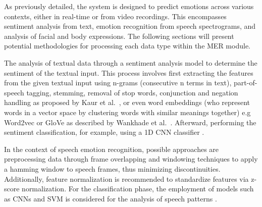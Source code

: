 \documentclass[runningheads]{llncs}
\begin{document}
As previously detailed, the system is designed to predict emotions across various contexts, either in real-time or from video recordings. This encompasses sentiment analysis from text, emotion recognition from speech spectrograms, and analysis of facial and body expressions. The following sections will present potential methodologies for processing each data type within the MER module.

The analysis of textual data through a sentiment analysis model to determine the sentiment of the textual input. This process involves first extracting the features from the given textual input using n-grams (consecutive n terms in text), part-of-speech tagging, stemming, removal of stop words, conjunction and negation handling as proposed by Kaur et al.~\cite{kaur_survey_2017}, or even word embeddings (who represent words in a vector space by clustering words with similar meanings together) e.g Word2vec or GloVe as described by Wankhade et al.~\cite{wankhade_survey_2022}. Afterward, performing the sentiment classification, for example, using a 1D CNN classifier \cite{hung_beyond_2023}.

In the context of speech emotion recognition, possible approaches are preprocessing data through frame overlapping and windowing techniques to apply a hamming window to speech frames, thus minimizing discontinuities. Additionally, feature normalization is recommended to standardize features via z-score normalization. For the classification phase, the employment of models such as CNNs and SVM is considered for the analysis of speech patterns \cite{Ayadi2011, Badshah2017}.
\end{document}
